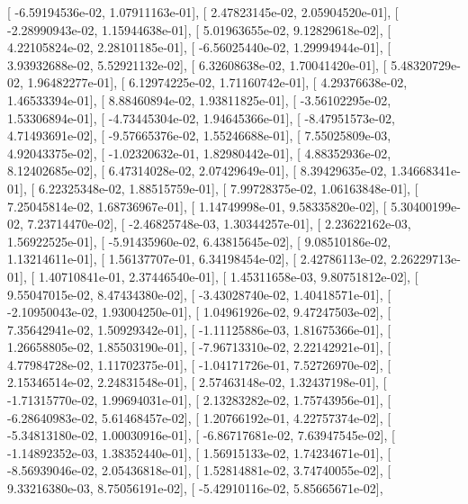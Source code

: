 \documentclass{article}
\begin{document}
       [ -6.59194536e-02,   1.07911163e-01],
       [  2.47823145e-02,   2.05904520e-01],
       [ -2.28990943e-02,   1.15944638e-01],
       [  5.01963655e-02,   9.12829618e-02],
       [  4.22105824e-02,   2.28101185e-01],
       [ -6.56025440e-02,   1.29994944e-01],
       [  3.93932688e-02,   5.52921132e-02],
       [  6.32608638e-02,   1.70041420e-01],
       [  5.48320729e-02,   1.96482277e-01],
       [  6.12974225e-02,   1.71160742e-01],
       [  4.29376638e-02,   1.46533394e-01],
       [  8.88460894e-02,   1.93811825e-01],
       [ -3.56102295e-02,   1.53306894e-01],
       [ -4.73445304e-02,   1.94645366e-01],
       [ -8.47951573e-02,   4.71493691e-02],
       [ -9.57665376e-02,   1.55246688e-01],
       [  7.55025809e-03,   4.92043375e-02],
       [ -1.02320632e-01,   1.82980442e-01],
       [  4.88352936e-02,   8.12402685e-02],
       [  6.47314028e-02,   2.07429649e-01],
       [  8.39429635e-02,   1.34668341e-01],
       [  6.22325348e-02,   1.88515759e-01],
       [  7.99728375e-02,   1.06163848e-01],
       [  7.25045814e-02,   1.68736967e-01],
       [  1.14749998e-01,   9.58335820e-02],
       [  5.30400199e-02,   7.23714470e-02],
       [ -2.46825748e-03,   1.30344257e-01],
       [  2.23622162e-03,   1.56922525e-01],
       [ -5.91435960e-02,   6.43815645e-02],
       [  9.08510186e-02,   1.13214611e-01],
       [  1.56137707e-01,   6.34198454e-02],
       [  2.42786113e-02,   2.26229713e-01],
       [  1.40710841e-01,   2.37446540e-01],
       [  1.45311658e-03,   9.80751812e-02],
       [  9.55047015e-02,   8.47434380e-02],
       [ -3.43028740e-02,   1.40418571e-01],
       [ -2.10950043e-02,   1.93004250e-01],
       [  1.04961926e-02,   9.47247503e-02],
       [  7.35642941e-02,   1.50929342e-01],
       [ -1.11125886e-03,   1.81675366e-01],
       [  1.26658805e-02,   1.85503190e-01],
       [ -7.96713310e-02,   2.22142921e-01],
       [  4.77984728e-02,   1.11702375e-01],
       [ -1.04171726e-01,   7.52726970e-02],
       [  2.15346514e-02,   2.24831548e-01],
       [  2.57463148e-02,   1.32437198e-01],
       [ -1.71315770e-02,   1.99694031e-01],
       [  2.13283282e-02,   1.75743956e-01],
       [ -6.28640983e-02,   5.61468457e-02],
       [  1.20766192e-01,   4.22757374e-02],
       [ -5.34813180e-02,   1.00030916e-01],
       [ -6.86717681e-02,   7.63947545e-02],
       [ -1.14892352e-03,   1.38352440e-01],
       [  1.56915133e-02,   1.74234671e-01],
       [ -8.56939046e-02,   2.05436818e-01],
       [  1.52814881e-02,   3.74740055e-02],
       [  9.33216380e-03,   8.75056191e-02],
       [ -5.42910116e-02,   5.85665671e-02],
\end{document}

